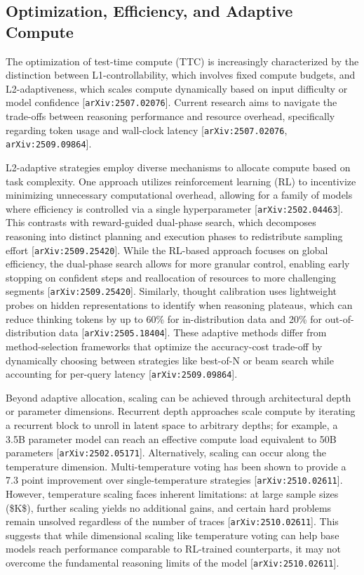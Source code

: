 \documentclass[11pt]{article}
\begin{document}
\subsection{Optimization, Efficiency, and Adaptive Compute}

The optimization of test-time compute (TTC) is increasingly characterized by the distinction between L1-controllability, which involves fixed compute budgets, and L2-adaptiveness, which scales compute dynamically based on input difficulty or model confidence [\texttt{arXiv:2507.02076}]. Current research aims to navigate the trade-offs between reasoning performance and resource overhead, specifically regarding token usage and wall-clock latency [\texttt{arXiv:2507.02076}, \texttt{arXiv:2509.09864}].

L2-adaptive strategies employ diverse mechanisms to allocate compute based on task complexity. One approach utilizes reinforcement learning (RL) to incentivize minimizing unnecessary computational overhead, allowing for a family of models where efficiency is controlled via a single hyperparameter [\texttt{arXiv:2502.04463}]. This contrasts with reward-guided dual-phase search, which decomposes reasoning into distinct planning and execution phases to redistribute sampling effort [\texttt{arXiv:2509.25420}]. While the RL-based approach focuses on global efficiency, the dual-phase search allows for more granular control, enabling early stopping on confident steps and reallocation of resources to more challenging segments [\texttt{arXiv:2509.25420}]. Similarly, thought calibration uses lightweight probes on hidden representations to identify when reasoning plateaus, which can reduce thinking tokens by up to 60\% for in-distribution data and 20\% for out-of-distribution data [\texttt{arXiv:2505.18404}]. These adaptive methods differ from method-selection frameworks that optimize the accuracy-cost trade-off by dynamically choosing between strategies like best-of-N or beam search while accounting for per-query latency [\texttt{arXiv:2509.09864}].

Beyond adaptive allocation, scaling can be achieved through architectural depth or parameter dimensions. Recurrent depth approaches scale compute by iterating a recurrent block to unroll in latent space to arbitrary depths; for example, a 3.5B parameter model can reach an effective compute load equivalent to 50B parameters [\texttt{arXiv:2502.05171}]. Alternatively, scaling can occur along the temperature dimension. Multi-temperature voting has been shown to provide a 7.3 point improvement over single-temperature strategies [\texttt{arXiv:2510.02611}]. However, temperature scaling faces inherent limitations: at large sample sizes (\$K\$), further scaling yields no additional gains, and certain hard problems remain unsolved regardless of the number of traces [\texttt{arXiv:2510.02611}]. This suggests that while dimensional scaling like temperature voting can help base models reach performance comparable to RL-trained counterparts, it may not overcome the fundamental reasoning limits of the model [\texttt{arXiv:2510.02611}].
\end{document}

